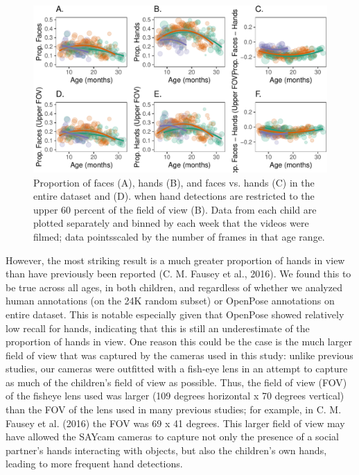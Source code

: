 \documentclass[10pt, letterpaper]{article}
\newenvironment{CodeChunk}{}{}
\begin{document}
\begin{CodeChunk}
\begin{figure}[h]

{\centering \includegraphics{figs/FaceVsHands-1} 

}

\caption[Proportion of faces (A), hands (B), and faces vs]{Proportion of faces (A), hands (B), and faces vs. hands (C) in the entire dataset and (D). when hand detections are restricted to the upper 60 percent of the field of view (B). Data from each child are plotted separately and binned by each week that the videos were filmed; data pointsscaled by the number of frames in that age range.}\label{fig:FaceVsHands}
\end{figure}
\end{CodeChunk}

However, the most striking result is a much greater proportion of hands
in view than have previously been reported (C. M. Fausey et al., 2016).
We found this to be true across all ages, in both children, and
regardless of whether we analyzed human annotations (on the 24K random
subset) or OpenPose annotations on entire dataset. This is notable
especially given that OpenPose showed relatively low recall for hands,
indicating that this is still an underestimate of the proportion of
hands in view. One reason this could be the case is the much larger
field of view that was captured by the cameras used in this study:
unlike previous studies, our cameras were outfitted with a fish-eye lens
in an attempt to capture as much of the children's field of view as
possible. Thus, the field of view (FOV) of the fisheye lens used was
larger (109 degrees horizontal x 70 degrees vertical) than the FOV of
the lens used in many previous studies; for example, in C. M. Fausey et
al. (2016) the FOV was 69 x 41 degrees. This larger field of view may
have allowed the SAYcam cameras to capture not only the presence of a
social partner's hands interacting with objects, but also the children's
own hands, leading to more frequent hand detections.
\end{document}
